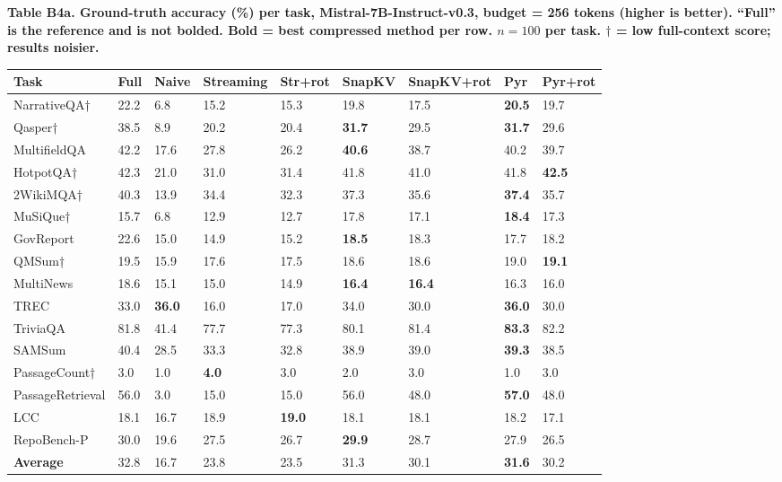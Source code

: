 \documentclass[10pt,letterpaper]{article}
\begin{document}
\textbf{Table B4a. Ground-truth accuracy (\%) per task, Mistral-7B-Instruct-v0.3,
budget = 256 tokens (higher is better). ``Full'' is the reference and is not bolded.
Bold = best compressed method per row.
$n = 100$ per task. \(\dagger\) = low full-context score; results noisier.}

\nopagebreak
\begin{table}[H]
\centering
\small
\begin{tabular}{@{}lllllllll@{}}
\toprule
Task & Full & Naive & Streaming & Str+rot & SnapKV & SnapKV+rot & Pyr &
Pyr+rot\\
\midrule
NarrativeQA† & 22.2 & 6.8 & 15.2 & 15.3 & 19.8 & 17.5 & \textbf{20.5} &
19.7\\
Qasper† & 38.5 & 8.9 & 20.2 & 20.4 & \textbf{31.7} & 29.5 & \textbf{31.7} &
29.6\\
MultifieldQA & 42.2 & 17.6 & 27.8 & 26.2 & \textbf{40.6} & 38.7 & 40.2 &
39.7\\
HotpotQA† & 42.3 & 21.0 & 31.0 & 31.4 & 41.8 & 41.0 & 41.8 &
\textbf{42.5}\\
2WikiMQA† & 40.3 & 13.9 & 34.4 & 32.3 & 37.3 & 35.6 & \textbf{37.4} &
35.7\\
MuSiQue† & 15.7 & 6.8 & 12.9 & 12.7 & 17.8 & 17.1 & \textbf{18.4} &
17.3\\
GovReport & 22.6 & 15.0 & 14.9 & 15.2 & \textbf{18.5} & 18.3 & 17.7 &
18.2\\
QMSum† & 19.5 & 15.9 & 17.6 & 17.5 & 18.6 & 18.6 & 19.0 &
\textbf{19.1}\\
MultiNews & 18.6 & 15.1 & 15.0 & 14.9 & \textbf{16.4} & \textbf{16.4} & 16.3 &
16.0\\
TREC & 33.0 & \textbf{36.0} & 16.0 & 17.0 & 34.0 & 30.0 & \textbf{36.0} &
30.0\\
TriviaQA & 81.8 & 41.4 & 77.7 & 77.3 & 80.1 & 81.4 & \textbf{83.3} &
82.2\\
SAMSum & 40.4 & 28.5 & 33.3 & 32.8 & 38.9 & 39.0 & \textbf{39.3} &
38.5\\
PassageCount† & 3.0 & 1.0 & \textbf{4.0} & 3.0 & 2.0 & 3.0 & 1.0 &
3.0\\
PassageRetrieval & 56.0 & 3.0 & 15.0 & 15.0 & 56.0 & 48.0 & \textbf{57.0} &
48.0\\
LCC & 18.1 & 16.7 & 18.9 & \textbf{19.0} & 18.1 & 18.1 & 18.2 &
17.1\\
RepoBench-P & 30.0 & 19.6 & 27.5 & 26.7 & \textbf{29.9} & 28.7 & 27.9 &
26.5\\
\textbf{Average} & 32.8 & 16.7 & 23.8 & 23.5 & 31.3 & 30.1 & \textbf{31.6} &
30.2\\
\bottomrule
\end{tabular}
\end{table}
\end{document}
